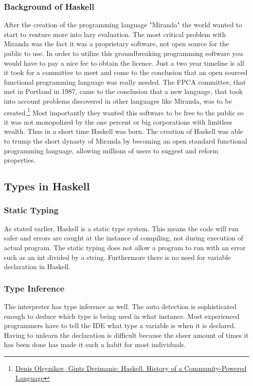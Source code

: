 \documentclass{article}
\begin{document}
        \subsubsection{Background of Haskell}
        After the creation of the programming language "Miranda" the world wanted to start to venture more into lazy evaluation. The most critical problem with Miranda was the fact it was a proprietary software, not open source for the public to use. In order to utilize this groundbreaking programming software you would have to pay a nice fee to obtain the licence. Just a two year timeline is all it took for a committee to meet and come to the conclusion that an open sourced functional programming language was really needed. The FPCA committee, that met in Portland in 1987, came to the conclusion that a new language, that took into account problems discovered in other languages like Miranda, was to be created.\footnote{\href{https://serokell.io/blog/haskell-history}{Denis Oleynikov, Gints Dreimanis: Haskell. History of a Community-Powered Language}} Most importantly they wanted this software to be free to the public so it was not monopolized by the one percent or big corporations with limitless wealth. Thus in a short time Haskell was born. The creation of Haskell was able to trump the short dynasty of Miranda by becoming an open standard functional programming language, allowing millions of users to suggest and reform properties. 

\subsection{Types in Haskell}

    \subsubsection{Static Typing}
    As stated earlier, Haskell is a static type system. This means the code will run safer and errors are caught at the instance of compiling, not during execution of actual program. The static typing does not allow a program to run with an error such as an int divided by a string. Furthermore there is no need for variable declaration in Haskell. 
    
    \subsubsection{Type Inference}
    The interpreter has type inference as well. The auto detection is sophisticated enough to deduce which type is being used in what instance. Most experienced programmers have to tell the IDE what type a variable is when it is declared. Having to unlearn the declaration is difficult because the sheer amount of times it has been done has made it such a habit for most individuals.
    
\end{document}
